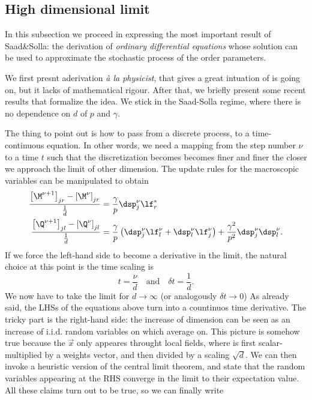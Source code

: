 \subsection{High dimensional limit}
In this subsection we proceed in expressing the most important result of Saad\&Solla\cite{saad1995line}:
the derivation of \emph{ordinary differential equations} whose solution can be used
to approximate the stochastic process of the order parameters. 

We first presnt aderivation \emph{à la physicist}, that gives a great intuation of is going on,
but it lacks of mathematical rigour. After that, we briefly present some recent results that
formalize the idea.
We stick in the Saad-Solla regime, where there is no dependence on \(d\) of \(p\) and \(\gamma\).

The thing to point out is how to pass from a discrete process, to a time-continuous equation.
In other words, we need a mapping from the step number \(\nu\) to a time \(t\) such that
the discretization becomes becomes finer and finer the closer we approach the limit of other dimension.
The update rules for the macroscopic variables can be manipulated to obtain
\begin{align}
  \frac{\left[\M^{\nu+1}\right]_{jr} - \left[\M^{\nu}\right]_{jr}}{\frac1d} &= \frac{\gamma}{p} \dsp^\nu_j \lf_r^*\\
  \frac{\left[\Q^{\nu+1}\right]_{jl} - \left[\Q^{\nu}\right]_{jl}}{\frac1d} &=
    \frac{\gamma}{p}\left(\dsp^\nu_j \lf_l^\nu + \dsp^\nu_l \lf_j^\nu\right) + \frac{\gamma^2}{p^2} \dsp^\nu_j\dsp^\nu_l.
\end{align}
If we force the left-hand side to become a derivative in the limit, the natural choice at this point is the time scaling is
\[t=\frac{\nu}{d} \quad\text{and}\quad \delta{t} =\frac1d.\]
We now have to take the limit for \(d\to\infty\) (or analogously \(\delta t \to 0\))
As already said, the LHSs of the equations above turn into a countinuos time derivative.
The tricky part is the right-hand side: the increase of dimension can be seen as 
an increase of i.i.d. random variables on which average on. This picture is somehow true
because the \(\vec{x}\) only appeares throught local fields, where is first scalar-multiplied
by a weights vector, and then divided by a scaling \(\sqrt{d}\). 
We can then invoke a heuristic version of the central limit theorem,
and state that the random variables appearing at the RHS converge in the limit
to their expectation value. All these claims turn out to be true, so we can finally write
